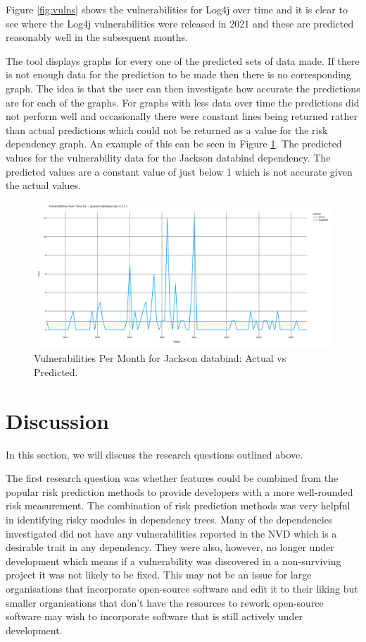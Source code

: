 \documentclass[conference]{IEEEtran}
\begin{document}
{Figure \ref{fig:vulns} shows the vulnerabilities for Log4j over time and it is clear to see where the Log4j vulnerabilities were released in 2021 and these are predicted reasonably well in the subsequent months. 

The tool displays graphs for every one of the predicted sets of data made. If there is not enough data for the prediction to be made then there is no corresponding graph. The idea is that the user can then investigate how accurate the predictions are for each of the graphs. For graphs with less data over time the predictions did not perform well and occasionally there were constant lines being returned rather than actual predictions which could not be returned as a value for the risk dependency graph. An example of this can be seen in Figure \ref{fig:const}. The predicted values for the vulnerability data for the Jackson databind dependency. The predicted values are a constant value of just below 1 which is not accurate given the actual values. 

\begin{figure}
    \centering
    \includegraphics[width=1\linewidth]{Const.png}
    \caption{Vulnerabilities Per Month for Jackson databind: Actual vs Predicted.} 
    \label{fig:const}
\end{figure}

\section{Discussion}
In this section, we will discuss the research questions outlined above. 

The first research question was whether features could be combined from the popular risk prediction methods to provide developers with a more well-rounded risk measurement. The combination of risk prediction methods was very helpful in identifying risky modules in dependency trees. Many of the dependencies investigated did not have any vulnerabilities reported in the NVD which is a desirable trait in any dependency. They were also, however, no longer under development which means if a vulnerability was discovered in a non-surviving project it was not likely to be fixed. This may not be an issue for large organisations that incorporate open-source software and edit it to their liking but smaller organisations that don't have the resources to rework open-source software may wish to incorporate software that is still actively under development.

}
\end{document}
